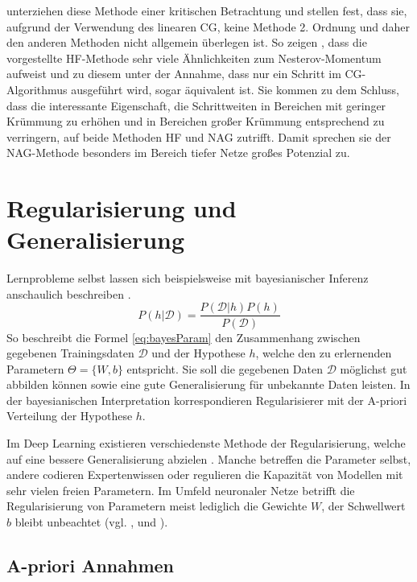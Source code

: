\cite{Sutskever2013} unterziehen diese Methode einer kritischen Betrachtung und stellen fest, dass sie, aufgrund der Verwendung des linearen CG, keine Methode 2. Ordnung und daher den anderen Methoden nicht allgemein überlegen ist. So zeigen \cite{Sutskever2013}, dass die vorgestellte HF-Methode sehr viele Ähnlichkeiten zum Nesterov-Momentum aufweist und zu diesem unter der Annahme, dass nur ein Schritt im CG-Algorithmus ausgeführt wird, sogar äquivalent ist. Sie kommen zu dem Schluss, dass die interessante Eigenschaft, die Schrittweiten in Bereichen mit geringer Krümmung zu erhöhen und in Bereichen großer Krümmung entsprechend zu verringern, auf beide Methoden HF und NAG zutrifft. Damit sprechen sie der NAG-Methode besonders im Bereich tiefer Netze großes Potenzial zu.
					

\section{Regularisierung und Generalisierung}
Lernprobleme selbst lassen sich beispielsweise mit bayesianischer Inferenz anschaulich beschreiben \cite[vgl. hierzu und im Folgenden][S. 159f]{Mitchell1997}.
\begin{equation}
\label{eq:bayesParam}
P(h|\mathcal{D}) = \frac{P(\mathcal{D}|h)P(h)}{P(\mathcal{D})}
\end{equation}
So beschreibt die Formel \ref{eq:bayesParam} den Zusammenhang zwischen gegebenen Trainingsdaten $\mathcal{D}$ und der Hypothese $h$, welche den zu erlernenden Parametern  $\Theta = \{W,b\} $ entspricht. Sie soll die gegebenen Daten $\mathcal{D}$ möglichst gut abbilden können sowie eine gute Generalisierung für unbekannte Daten leisten. In der bayesianischen Interpretation korrespondieren Regularisierer mit der A-priori Verteilung der Hypothese $h$.

Im Deep Learning existieren verschiedenste Methode der Regularisierung, welche auf eine bessere Generalisierung abzielen \cite[vgl. hierzu und im Folgenden][Kap. 7, S. 196]{Bengio2015}. Manche betreffen die Parameter selbst, andere codieren Expertenwissen oder regulieren die Kapazität von Modellen mit sehr vielen freien Parametern. 
Im Umfeld neuronaler Netze betrifft die Regularisierung von Parametern meist lediglich die Gewichte $W$, der Schwellwert $b$ bleibt unbeachtet (vgl. \cite{Hinton2012} ,\cite{Kaparthy2014} und \cite{Srivastava2014}).
					

\subsection{A-priori Annahmen}

